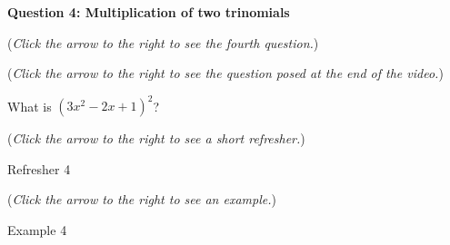 \documentclass{ximera}
\begin{document}
\textbf{Question 4: Multiplication of two trinomials}
\begin{question}
\begin{flushright}
{\color{blue}(\emph{Click the arrow to the right to see the fourth question.})}
\end{flushright}
\begin{center}
\begin{expandable}
{\color{blue}(\emph{Click the arrow to the right to see the question
posed at the end of the video.})}
\begin{expandable}
What is $(3x^2 - 2x + 1)^2$?
\begin{multipleChoice}
\end{multipleChoice}
\begin{flushright}
{\color{blue}(\emph{Click the arrow to the right to see a short refresher.})}
\end{flushright}
\begin{expandable}
Refresher 4
\end{expandable}
\begin{flushright}
{\color{blue}(\emph{Click the arrow to the right to see an example.})}
\end{flushright}
\begin{expandable}
Example 4
\end{expandable}
\end{expandable}
\end{expandable}
\end{center}
\end{question}
\end{document}
